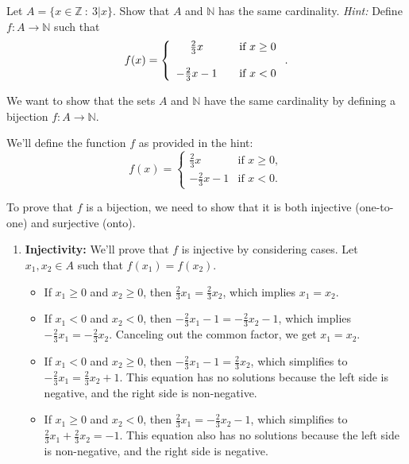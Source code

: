 \documentclass{article}
\newcommand{\Z}{\mathbb{Z}}
\newcommand{\N}{\mathbb{N}}
\theoremstyle{definition}
\begin{document}
\begin{question}
    Let $A = \{ x \in \Z ~:~ 3|x \}$.  Show that $A$ and $\mathbb{N}$ has the same cardinality.  {\it Hint:} Define $f: A \rightarrow \N$ such that
\[ f(x) =\left\{\begin{array}{c c l} \frac{2}{3}x & & \text{if } x \geq 0 \\ ~ \\ -\frac{2}{3}x - 1 &  & \text{if } x < 0 \end{array} \right. .\]
\end{question}
\begin{solution}
We want to show that the sets $A$ and $\mathbb{N}$ have the same cardinality by defining a bijection $f: A \to \mathbb{N}$.

We'll define the function $f$ as provided in the hint:
\[ f(x) =\left\{
\begin{array}{lll}
\frac{2}{3}x & \text{if } x \geq 0, \\
-\frac{2}{3}x - 1 & \text{if } x < 0.
\end{array}
\right.
\]

To prove that $f$ is a bijection, we need to show that it is both injective (one-to-one) and surjective (onto).

\begin{enumerate}
\item \textbf{Injectivity:} We'll prove that $f$ is injective by considering cases. Let $x_1, x_2 \in A$ such that $f(x_1) = f(x_2)$.

\begin{itemize}
\item If $x_1 \geq 0$ and $x_2 \geq 0$, then $\frac{2}{3}x_1 = \frac{2}{3}x_2$, which implies $x_1 = x_2$.

\item If $x_1 < 0$ and $x_2 < 0$, then $-\frac{2}{3}x_1 - 1 = -\frac{2}{3}x_2 - 1$, which implies $-\frac{2}{3}x_1 = -\frac{2}{3}x_2$. Canceling out the common factor, we get $x_1 = x_2$.

\item If $x_1 < 0$ and $x_2 \geq 0$, then $-\frac{2}{3}x_1 - 1 = \frac{2}{3}x_2$, which simplifies to $-\frac{2}{3}x_1 = \frac{2}{3}x_2 + 1$. This equation has no solutions because the left side is negative, and the right side is non-negative.

\item If $x_1 \geq 0$ and $x_2 < 0$, then $\frac{2}{3}x_1 = -\frac{2}{3}x_2 - 1$, which simplifies to $\frac{2}{3}x_1 + \frac{2}{3}x_2 = -1$. This equation also has no solutions because the left side is non-negative, and the right side is negative.


\end{itemize}
\end{enumerate}
\end{solution}
\end{document}
